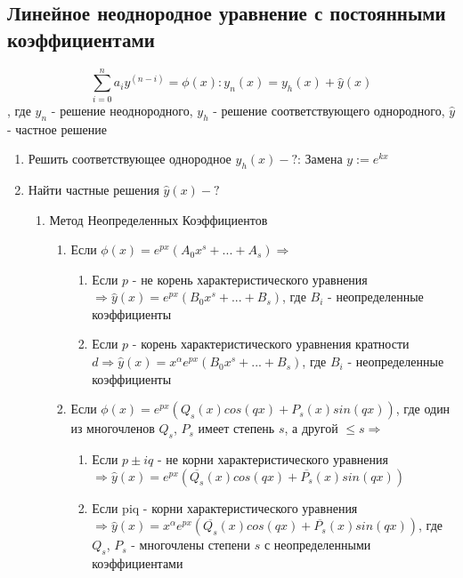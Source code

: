 \documentclass[a5paper,10pt]{article}
\begin{document}
		\subsection{Линейное неоднородное уравнение с постоянными коэффициентами}
			\label{LinearNonhomogeneous}
			$$ \sum\limits_{i=0}^n a_i y^{(n-i)} = \phi(x): y_n(x) = y_h(x)+\hat y(x) $$, где $ y_n $ - решение неоднородного, $ y_h $ - решение соответствующего однородного, $ \hat y $ - частное решение
			\begin{enumerate}
				\item Решить соответствующее однородное $ y_h(x) - ? $: Замена $ y:=e^{kx} $

				\item Найти частные решения $ \hat y(x) - ? $
					\begin{enumerate}
						\item Метод Неопределенных Коэффициентов
							\begin{enumerate}
								\item Если $ \phi(x) =e^{px}(A_0x^s+...+A_s) \Rightarrow $
								\begin{enumerate}
									\item Если $p$ - не корень характеристического уравнения $ \Rightarrow \hat y(x) = e^{px}(B_0x^s+...+B_s) $, где $B_i$ - неопределенные коэффициенты
									\item Если $p$ - корень характеристического уравнения кратности $d \Rightarrow \hat y(x) = x^\alpha e^{px}(B_0x^s+...+B_s)$, где $B_i$ - неопределенные коэффициенты
								\end{enumerate}
								\item Если $ \phi(x) = e^{px}(Q_s(x)cos(qx)+P_s(x)sin(qx)) $, где один из многочленов $Q_s$, $P_s$ имеет степень $s$, а другой $\leq s \Rightarrow$
								\begin{enumerate}
									\item Если $p\pm iq$ - не корни характеристического уравнения $ \Rightarrow \hat y(x) = e^{px}(\overline{Q_s}(x)cos(qx)+\overline{P_s}(x)sin(qx)) $
									\item Если piq - корни характеристического уравнения $ \Rightarrow \hat y(x) = x^\alpha e^{px}(\overline{Q_s}(x)cos(qx)+\overline{P_s}(x)sin(qx)) $, где $Q_s$, $P_s$ - многочлены степени $s$ с неопределенными коэффициентами
								\end{enumerate}
							\end{enumerate}


\end{enumerate}
\end{enumerate}
\end{document}
